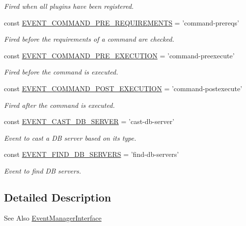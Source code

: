 \begin{DoxyCompactItemize}
\begin{DoxyCompactList}\small\item\em Fired when all plugins have been registered. \end{DoxyCompactList}\item 
const \hyperlink{group__events_gac0e1fb5341f5e15a436958b5176678b0}{E\-V\-E\-N\-T\-\_\-\-C\-O\-M\-M\-A\-N\-D\-\_\-\-P\-R\-E\-\_\-\-R\-E\-Q\-U\-I\-R\-E\-M\-E\-N\-T\-S} = 'command-\/prereqs'
\begin{DoxyCompactList}\small\item\em Fired before the requirements of a command are checked. \end{DoxyCompactList}\item 
const \hyperlink{group__events_gabe685755de0eb3af1e1853138eed399e}{E\-V\-E\-N\-T\-\_\-\-C\-O\-M\-M\-A\-N\-D\-\_\-\-P\-R\-E\-\_\-\-E\-X\-E\-C\-U\-T\-I\-O\-N} = 'command-\/preexecute'
\begin{DoxyCompactList}\small\item\em Fired before the command is executed. \end{DoxyCompactList}\item 
const \hyperlink{group__events_ga3e0b4f668de297a00c286c8d490cbe28}{E\-V\-E\-N\-T\-\_\-\-C\-O\-M\-M\-A\-N\-D\-\_\-\-P\-O\-S\-T\-\_\-\-E\-X\-E\-C\-U\-T\-I\-O\-N} = 'command-\/postexecute'
\begin{DoxyCompactList}\small\item\em Fired after the command is executed. \end{DoxyCompactList}\item 
const \hyperlink{group__events_ga995abd83b9e56a165029cc26c24cdb13}{E\-V\-E\-N\-T\-\_\-\-C\-A\-S\-T\-\_\-\-D\-B\-\_\-\-S\-E\-R\-V\-E\-R} = 'cast-\/db-\/server'
\begin{DoxyCompactList}\small\item\em Event to cast a D\-B server based on its type. \end{DoxyCompactList}\item 
const \hyperlink{group__events_gadbf9bda7e59b16c872f429349760b4dc}{E\-V\-E\-N\-T\-\_\-\-F\-I\-N\-D\-\_\-\-D\-B\-\_\-\-S\-E\-R\-V\-E\-R\-S} = 'find-\/db-\/servers'
\begin{DoxyCompactList}\small\item\em Event to find D\-B servers. \end{DoxyCompactList}\end{DoxyCompactItemize}


\subsection{Detailed Description}
\begin{DoxySeeAlso}{See Also}
\hyperlink{interfaceEventManagerInterface}{Event\-Manager\-Interface} 
\end{DoxySeeAlso}


